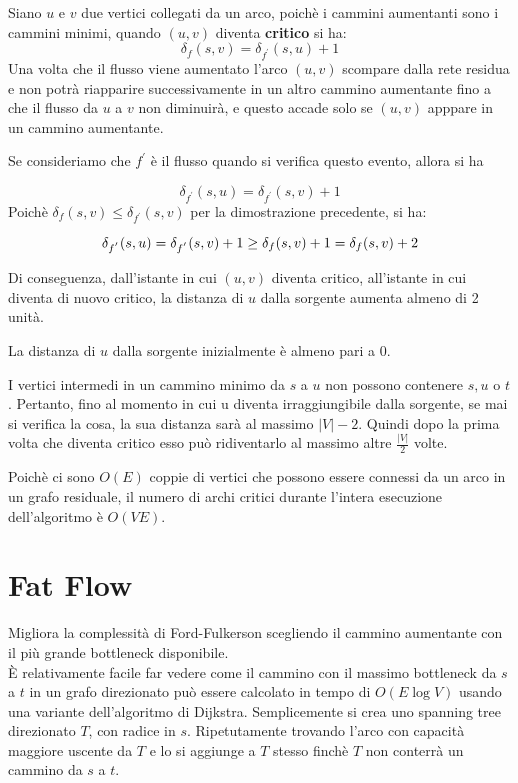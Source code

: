 Siano $u$ e $v$ due vertici collegati da un arco, poichè i cammini aumentanti sono i cammini minimi, quando $(u,v)$ diventa \textbf{critico} si ha:
$$
    \delta_f(s,v) = \delta_{f^{'}}(s,u) +1
$$
Una volta che il flusso viene aumentato l'arco $(u,v)$ scompare dalla rete residua e non potrà riapparire successivamente in un altro cammino aumentante fino a che il flusso da $u$ a $v$ non diminuirà, e questo accade solo se $(u,v)$ apppare in un cammino aumentante.

Se consideriamo che $f^{'}$ è il flusso quando si verifica questo evento, allora si ha 

$$
    \delta_{f^{'}}(s,u) = \delta_{f^{'}}(s,v) +1
$$
Poichè $\delta_f(s,v) \le \delta_{f^{'}}(s,v)$ per la dimostrazione precedente, si ha:

$$
    \delta_{f^{'}}(s,u) =  \delta_{f^{'}}(s,v) + 1 \\
    \ge \delta_f(s,v) + 1
    = \delta_f(s,v) +2
$$


Di conseguenza, dall'istante in cui $(u,v)$ diventa critico, all'istante in cui diventa di nuovo critico, la distanza di $u$ dalla sorgente aumenta almeno di 2 unità.

La distanza di $u$ dalla sorgente inizialmente è almeno pari a 0.

I vertici intermedi in un cammino minimo da $s$ a $u$ non possono contenere $s, u$ o $t$.
Pertanto, fino al momento in cui u diventa irraggiungibile dalla sorgente, se mai si verifica la cosa, la sua distanza sarà al massimo $|V| -2$. Quindi dopo la prima volta che diventa critico esso può ridiventarlo al massimo altre $\frac{|V|}{2}$ volte.

Poichè ci sono $O(E)$ coppie di vertici che possono essere connessi da un arco in un grafo residuale, il numero di archi critici durante l'intera esecuzione dell'algoritmo è  $O(VE)$.




\section{Fat Flow}
Migliora la complessità di Ford-Fulkerson scegliendo il cammino aumentante con il più grande bottleneck disponibile.\\

È relativamente facile far vedere come il cammino con il massimo bottleneck da $s$ a $t$ in un grafo direzionato può essere calcolato in tempo di $O(E\log{V})$ usando una variante dell'algoritmo di Dijkstra. Semplicemente si crea uno spanning tree direzionato $T$, con radice in $s$. Ripetutamente trovando l'arco con capacità maggiore uscente da $T$ e lo si aggiunge a $T$ stesso finchè $T$ non conterrà un cammino da $s$ a $t$.

